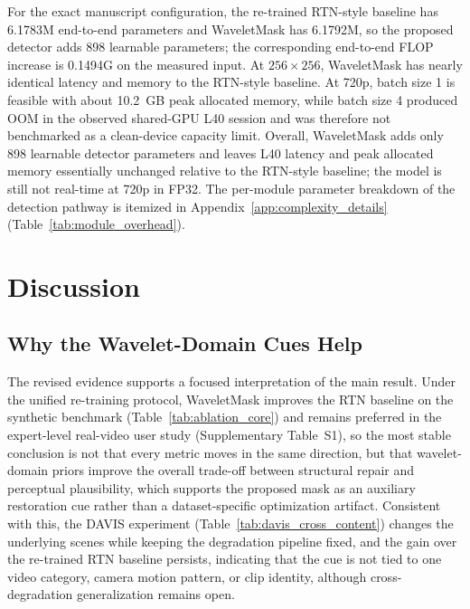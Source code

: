{For the exact manuscript configuration, the re-trained RTN-style baseline has 6.1783M end-to-end parameters and WaveletMask has 6.1792M, so the proposed detector adds 898 learnable parameters; the corresponding end-to-end FLOP increase is 0.1494G on the measured input. At $256\times256$, WaveletMask has nearly identical latency and memory to the RTN-style baseline. At 720p, batch size 1 is feasible with about 10.2~GB peak allocated memory, while batch size 4 produced OOM in the observed shared-GPU L40 session and was therefore not benchmarked as a clean-device capacity limit. Overall, WaveletMask adds only 898 learnable detector parameters and leaves L40 latency and peak allocated memory essentially unchanged relative to the RTN-style baseline; the model is still not real-time at 720p in FP32. The per-module parameter breakdown of the detection pathway is itemized in Appendix~\ref{app:complexity_details} (Table~\ref{tab:module_overhead}).


\section{Discussion}\label{sec:discussion}

\subsection{Why the Wavelet-Domain Cues Help}\label{subsec:fusion_insight}\label{subsec:freq_complement}\label{subsec:wavelet_choice}

The revised evidence supports a focused interpretation of the main result. Under the unified re-training protocol, WaveletMask improves the RTN baseline on the synthetic benchmark (Table~\ref{tab:ablation_core}) and remains preferred in the expert-level real-video user study (Supplementary Table~S1), so the most stable conclusion is not that every metric moves in the same direction, but that wavelet-domain priors improve the overall trade-off between structural repair and perceptual plausibility, which supports the proposed mask as an auxiliary restoration cue rather than a dataset-specific optimization artifact. Consistent with this, the DAVIS experiment (Table~\ref{tab:davis_cross_content}) changes the underlying scenes while keeping the degradation pipeline fixed, and the gain over the re-trained RTN baseline persists, indicating that the cue is not tied to one video category, camera motion pattern, or clip identity, although cross-degradation generalization remains open.

}
